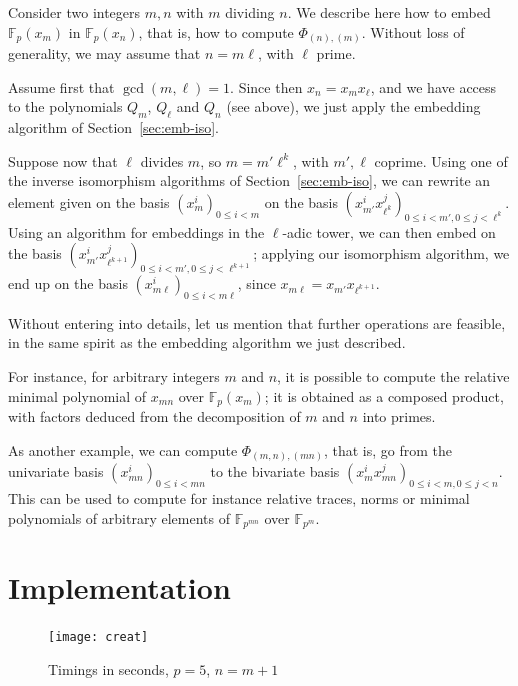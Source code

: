 \documentclass{sig-alternate}
\def\F {\ensuremath{\mathbb{F}}}
\newcounter{algo}
\begin{document}
\smallskip{} Consider two integers $m,n$
with $m$ dividing $n$. We describe here how to embed $\F_p(x_m)$ in
$\F_p(x_n)$, that is, how to compute $\Phi_{(n),(m)}$. Without loss of
generality, we may assume that $n = m\ell$, with $\ell$ prime.

Assume first that $\gcd(m,\ell)=1$. Since then $x_n = x_m x_\ell$, and
we have access to the polynomials $Q_m$, $Q_\ell$ and $Q_n$ (see
above), we just apply the embedding algorithm of
Section~\ref{sec:emb-iso}.

Suppose now that $\ell$ divides $m$, so $m=m'\ell^k$, with $m',\ell$
coprime. Using one of the inverse isomorphism algorithms of
Section~\ref{sec:emb-iso}, we can rewrite an element given on the
basis $(x_m^i)_{0 \le i < m}$ on the basis $(x_{m'}^i x_{\ell^k}^j)_{0
  \le i < m', 0 \le j < \ell^k}$. Using an algorithm for embeddings in
the $\ell$-adic tower, we can then embed on the basis $(x_{m'}^i
x_{\ell^{k+1}}^j)_{0 \le i < m', 0 \le j < \ell^{k+1}}$; applying our
isomorphism algorithm, we end up on the basis $(x_{m\ell}^i)_{0 \le i
  < m \ell}$, since $x_{m \ell} = x_{m'} x_{\ell^{k+1}}$.

\smallskip{}  Without entering
into details, let us mention that further operations are feasible, in
the same spirit as the embedding algorithm we just described.

For instance, for arbitrary integers $m$ and $n$, it is possible to
compute the relative minimal polynomial of $x_{mn}$ over $\F_p(x_m)$; it
is obtained as a composed product, with factors deduced from the
decomposition of $m$ and $n$ into primes.

As another example, we can compute $\Phi_{(m,n),(mn)}$, that is, go
from the univariate basis $(x_{mn}^i)_{0 \le i < mn}$ to the bivariate
basis \sloppy $(x_m^i x_{mn}^j)_{0 \le i < m, 0 \le j < n}$. This can
be used to compute for instance relative traces, norms or minimal
polynomials of arbitrary elements of $\F_{p^{mn}}$ over $\F_{p^m}$.


\section{Implementation}\label{sec:implem}

\begin{figure}
  \centering
  \texttt{[image: creat]}
  \caption{Timings in seconds, $p=5$, $n=m+1$}
  \label{fig:bench}
\vspace{-4ex}
\end{figure}
\end{document}
